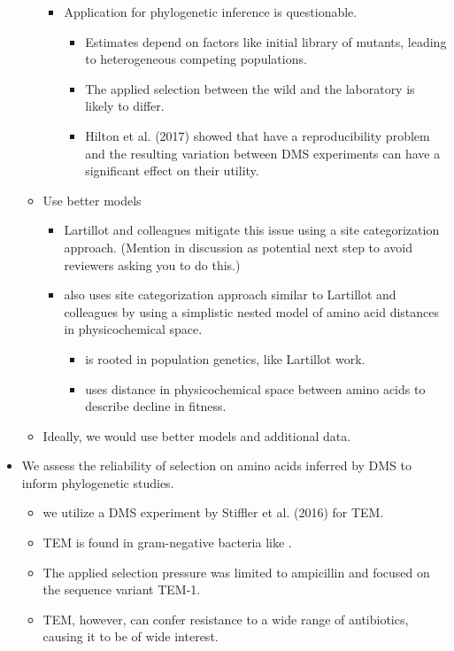 \documentclass[12pt]{article}
\begin{document}
\begin{itemize}
\begin{itemize}
\begin{itemize}
\begin{itemize}
			\end{itemize}
			\item Application for phylogenetic inference is questionable.
			\begin{itemize}	
				\item Estimates depend on factors like initial library of mutants, leading to heterogeneous competing populations.
				\item The applied selection between the wild and the laboratory is likely to differ.
				\item Hilton et al. (2017) showed that have a reproducibility problem and the resulting variation between DMS experiments can have a significant effect on their utility.
			\end{itemize}
		\end{itemize}
		\item Use better models
		\begin{itemize}
			\item Lartillot and colleagues mitigate this issue using a site categorization approach. (Mention in discussion as potential next step to avoid reviewers asking you to do this.)
			\item \selac also uses site categorization approach similar to Lartillot and colleagues by using a simplistic nested model of amino acid distances in physicochemical space.
			\begin{itemize}
				\item \selac is rooted in population genetics, like Lartillot work.
				\item \selac uses distance in physicochemical space between amino acids to describe decline in fitness.
			\end{itemize}        
		\end{itemize}
		\item Ideally, we would use better models and additional data.
	\end{itemize}
	\item We assess the reliability of selection on amino acids inferred by DMS to inform phylogenetic studies.
	\begin{itemize}
		\item we utilize a DMS experiment by Stiffler et al. (2016) for TEM.
		\item TEM is found in gram-negative bacteria like \ecoli.
		\item The applied selection pressure was limited to ampicillin and focused on the sequence variant TEM-1.
		\item TEM, however, can confer resistance to a wide range of antibiotics, causing it to be of wide interest.

\end{itemize}
\end{itemize}
\end{document}
